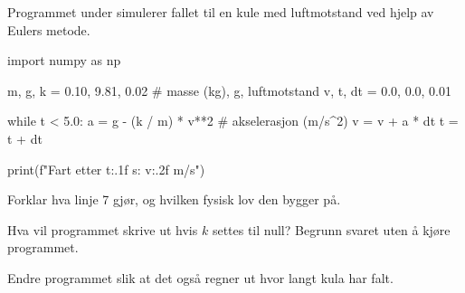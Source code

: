 \documentclass[12pt]{article}
\begin{document}
\begin{oppgave}
Programmet under simulerer fallet til en kule med luftmotstand ved hjelp av Eulers metode.

\begin{python}
import numpy as np

m, g, k = 0.10, 9.81, 0.02     # masse (kg), g, luftmotstand
v, t, dt = 0.0, 0.0, 0.01

while t < 5.0:
    a = g - (k / m) * v**2      # akselerasjon (m/s^2)
    v = v + a * dt
    t = t + dt

print(f"Fart etter {t:.1f} s: {v:.2f} m/s")
\end{python}

\begin{deloppgaver}
  \item Forklar hva linje 7 gjør, og hvilken fysisk lov den bygger på.
  \item Hva vil programmet skrive ut hvis $k$ settes til null? Begrunn svaret uten å kjøre programmet.
  \item Endre programmet slik at det også regner ut hvor langt kula har falt.
\end{deloppgaver}
\end{oppgave}
\end{document}
